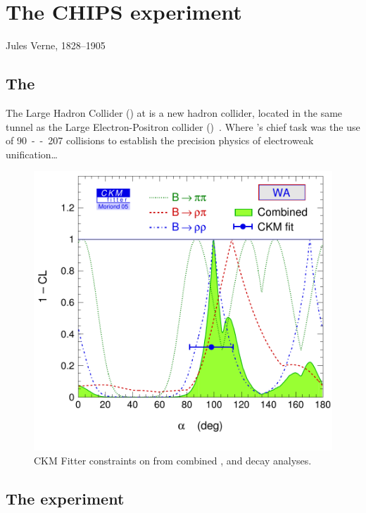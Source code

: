 \chapter{The CHIPS experiment}
\label{chap:chips}

{Jules Verne, 1828--1905}

\section{The \LHC}
The Large Hadron Collider (\LHC) at \CERN is a new hadron collider,
located in the same tunnel as the Large Electron-Positron collider
(\LEP)~\cite{Brianti:2004qq}. Where \LEP's chief task was the use
of \unit{90--207}{\GeV} \epluseminus collisions to establish the
precision physics of electroweak unification\dots

\begin{figure}
  \includegraphics[width=\largefigwidth]{diagrams/chips/ckmfitter-alpha-combined}
  \caption[CKM Fitter constraints on \alphaCKM.]%
  {CKM Fitter constraints on \alphaCKM from combined \BToPiPi,
    \BToRhoPi and \BToRhoRho decay analyses.}
  \label{fig:CKMFitter}
\end{figure}

\section{The \LHCb experiment}
\label{sec:LHCbInDetail}

